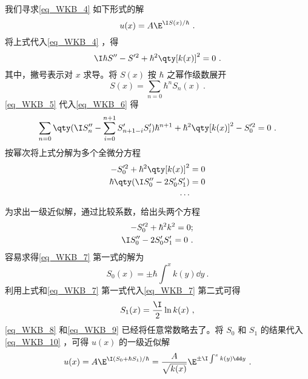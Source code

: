 我们寻求\autoref{eq_WKB_4} 如下形式的解
\begin{equation}\label{eq_WKB_10}
u(x)=A\E^{\I S(x)/\hbar}~.
\end{equation}
将上式代入\autoref{eq_WKB_4} ，得
\begin{equation}\label{eq_WKB_6}
\I\hbar S''-S'^2+\hbar^2\qty[k(x)]^2=0~.
\end{equation}
其中，撇号表示对 $x$ 求导。将 $S(x)$ 按 $\hbar$ 之幂作级数展开
\begin{equation}\label{eq_WKB_5}
S(x)=\sum_{n=0}\hbar^nS_n(x)~.
\end{equation}
\autoref{eq_WKB_5} 代入\autoref{eq_WKB_6} 得
\begin{equation}
\sum_{n=0}\qty(\I S_n''-\sum_{i=0}^{n+1}S_{n+1-i}'S_i')\hbar^{n+1}+\hbar^2\qty[k(x)]^2-S_0'^2=0~.
\end{equation}
按幂次将上式分解为多个全微分方程
\begin{equation}
\begin{aligned}
-S_0'^2+\hbar^2\qty[k(x)]^2&=0\\
\hbar\qty(\I S_0''-2S_0'S_1')&=0\\
\cdots
\end{aligned}
\end{equation}
为求出一级近似解，通过比较系数，给出头两个方程
\begin{equation}\label{eq_WKB_7}
\begin{aligned}
-S_0'^2+\hbar^2k^2=0;\\
\I S_0''-2S_0'S_1'=0~.
\end{aligned}
\end{equation}
容易求得\autoref{eq_WKB_7} 第一式的解为
\begin{equation}\label{eq_WKB_8}
S_0(x)=\pm\hbar\int^x k(y)\dd y~.
\end{equation}
利用上式和\autoref{eq_WKB_7} 第一式代入\autoref{eq_WKB_7} 第二式可得
\begin{equation}\label{eq_WKB_9}
S_1(x)=\frac{\I}{2}\ln k(x)~,
\end{equation}
\autoref{eq_WKB_8} 和\autoref{eq_WKB_9} 已经将任意常数略去了。将 $S_0$ 和 $S_1$ 的结果代入\autoref{eq_WKB_10} ，可得 $u(x)$ 的一级近似解
\begin{equation}\label{eq_WKB_11}
u(x)=A\E^{\I(S_0+\hbar S_1)/\hbar}=\frac{A}{\sqrt{k(x)}} \E^{\pm\I\int^x k(y)\dd y}~.
\end{equation}
